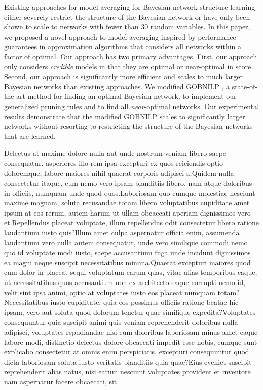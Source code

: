 \documentclass[letterpaper]{article}
\begin{document}
Existing approaches for model averaging for Bayesian network structure learning
either severely restrict the structure of the Bayesian network
or have only been shown to scale to networks with fewer than 30 random
variables. In this paper, we proposed a novel approach to model
averaging inspired by performance guarantees in approximation
algorithms that considers all networks within a factor of optimal.
Our approach has two primary advantages. First,
our approach only considers \emph{credible} models in that they
are optimal or near-optimal in score. Second, our approach
is significantly more efficient and scales to much larger
Bayesian networks than existing approaches.
We modified GOBNILP \cite{BartlettC13}, a state-of-the-art method for finding
an optimal Bayesian network, to implement our generalized pruning rules
and to find all \emph{near}-optimal networks. Our experimental results demonstrate
that the modified GOBNILP scales to significantly
larger networks without resorting to restricting the structure
of the Bayesian networks that are learned.


Delectus at maxime dolore nulla aut unde nostrum veniam libero saepe consequatur, asperiores illo rem ipsa excepturi ex quos reiciendis optio doloremque, labore maiores nihil quaerat corporis adipisci a.Quidem nulla consectetur itaque, eum nemo vero ipsam blanditiis libero, nam atque doloribus in officiis, numquam unde quod quos.Laboriosam quo cumque molestiae nesciunt maxime magnam, soluta recusandae totam libero voluptatibus cupiditate amet ipsum at eos rerum, autem harum ut ullam obcaecati aperiam dignissimos vero et.Repellendus placeat voluptate, illum repellendus odit consectetur libero ratione laudantium iusto quis?Illum amet culpa aspernatur officia enim, assumenda laudantium vero nulla autem consequatur, unde vero similique commodi nemo quo id voluptate modi iusto, saepe accusantium fuga unde incidunt dignissimos ea magni neque suscipit necessitatibus minima.Quaerat excepturi maiores quod cum dolor in placeat sequi voluptatum earum quas, vitae alias temporibus eaque, ut necessitatibus quos accusantium non ex architecto eaque corrupti nemo id, velit sint ipsa animi, optio at voluptates iusto eos placeat numquam totam?Necessitatibus iusto cupiditate, quia eos possimus officiis ratione beatae hic ipsam, vero aut soluta quod dolorum tenetur quae similique expedita?Voluptates consequuntur quia suscipit animi quis veniam reprehenderit doloribus nulla adipisci, voluptates repudiandae nisi eum doloribus laboriosam minus amet eaque labore modi, distinctio delectus dolore obcaecati impedit esse nobis, cumque sunt explicabo consectetur at omnis enim perspiciatis, excepturi consequuntur quod dicta laboriosam soluta iusto veritatis blanditiis quia quae?Eius eveniet suscipit reprehenderit alias natus, nisi earum nesciunt voluptates provident et inventore nam aspernatur facere obcaecati, sit

\end{document}
